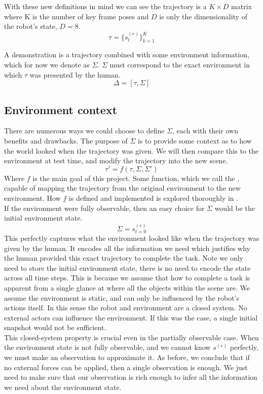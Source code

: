 With these new definitions in mind we can see the trajectory is a $K \times D$ matrix where K is the number of key frame poses and $D$ is only the dimensionality of the robot's state, $D = 8$.
$$\tau = \{s^{(r)}_t\}_{k=1}^K$$

A demonstration is a trajectory combined with some environment information, which for now we denote as $\Sigma$. $\Sigma$ must correspond to the exact environment in which $\tau$ was presented by the human.
$$\Delta = [\tau, \Sigma]$$

\subsection{Environment context}
There are numerous ways we could choose to define $\Sigma$, each with their own benefits and drawbacks. The purpose of $\Sigma$ is to provide some context as to how the world looked when the trajectory was given. We will then compare this to the environment at test time, and modify the trajectory into the new scene.
$$\tau' = f(\tau, \Sigma, \Sigma')$$
Where $f$ is the main goal of this project. Some function, which we call the , capable of mapping the trajectory from the original environment to the new environment. How $f$ is defined and implemented is explored thoroughly in .\\

If the environment were fully observable, then an easy choice for $\Sigma$ would be the initial environment state.
$$\Sigma = s^{(e)}_{t=0}$$
This perfectly captures what the environment looked like when the trajectory was given by the human. It encodes all the information we need which justifies why the human provided this exact trajectory to complete the task. Note we only need to store the initial environment state, there is no need to encode the state across all time steps. This is because we assume that how to complete a task is apparent from a single glance at where all the objects within the scene are. We assume the environment is static, and can only be influenced by the robot's actions itself. In this sense the robot and environment are a closed system. No external actors can influence the environment. If this was the case, a single initial snapshot would not be sufficient.\\

This closed-system property is crucial even in the partially observable case. When the environment state is not fully observable, and we cannot know $s^{(e)}$ perfectly, we must make an observation to approximate it. As before, we conclude that if no external forces can be applied, then a single observation is enough. We just need to make sure that our observation is rich enough to infer all the information we need about the environment state.\\


